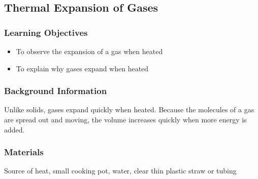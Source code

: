 

\subsection{Thermal Expansion of Gases}

\subsubsection*{Learning Objectives}
\begin{itemize}
\item{To observe the expansion of a gas when heated} 
\item{To explain why gases expand when heated} 
\end{itemize}

\subsubsection*{Background Information}
Unlike solids, gases expand quickly when heated. Because the molecules of a gas are spread out and moving, the volume increases quickly when more energy is added.  

\subsubsection*{Materials}
Source of heat, small cooking pot, water, clear thin plastic straw or tubing

